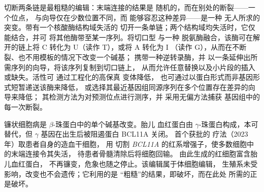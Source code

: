 \begin{proposition}[无断裂编辑]\label{prop:b3:genetic-engineering:editors}
切断两条链是最粗糙的编辑：末端连接的结果是
随机的，而在别处的断裂——一个\emph{}位点，
与向导仅在少数位置不同，而  能够容忍这种差异——是一种
无人所求的突变。带有一个核酸酶结构域失活的 
切开一条单链；两个结构域均失活时，它仅能结合，并可
将其他酶带至某一序列。\emph{}将切口型  与一种
脱氨酶融合，该酶可在解开的链上将 C 转化为 U（读作 T），或将 A 转化为 I
（读作 G），从而在不断裂、也不用模板的情况下改变一个碱基；
\emph{}携带一种逆转录酶，并
以一条延伸出所需序列的向导，将该序列复制到切口链上，
从而允许任意替换以及小片段的插入或缺失。活性可
通过工程化的高保真  变体降低，
也可通过以蛋白形式而非基因形式短暂递送该酶来降低，
或选择其最近基因组同源序列在多个位置存在差异的向导来降低；
其检测方法为对预测位点进行测序，并
采用无偏方法捕获
基因组中的每一次断裂。
\end{proposition}

\begin{example}[一种治愈]\label{ex:b3:genetic-engineering:sickle}
镰状细胞病是 $\beta$-珠蛋白中的单个碱基改变。胎儿
血红蛋白由 $\gamma$-珠蛋白构成，本可替代，但
$\gamma$ 基因在出生后被阻遏蛋白 BCL11A 关闭。
首个获批的  疗法（2023 年）取患者自身的造血干细胞，
用  切割 \emph{BCL11A} 的红系增强子，使多数细胞中的末端连接令其失活，
待患者骨髓清除后将细胞回输。
由此生成的红细胞富含胎儿血红蛋白，
不再镰变，危象也随之停止。该编辑属于体细胞编辑，
生殖系未受影响，改变也不会遗传；它利用的是
“粗糙”的结果，即破坏，而在此处
所需的正是破坏。
\end{example}

